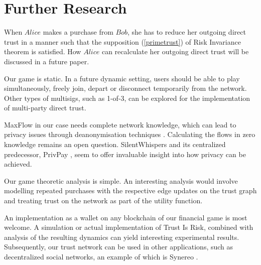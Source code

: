 \section{Further Research}

    When $Alice$ makes a purchase from $Bob$, she has to reduce her outgoing direct trust in a manner such that the
    supposition (\ref{primetrust}) of Risk Invariance theorem is satisfied. How $Alice$ can recalculate her outgoing
    direct trust will be discussed in a future paper.

    Our game is static. In a future dynamic setting, users should be able to play simultaneously, freely join, depart or
    disconnect temporarily from the network. Other types of multisigs, such as 1-of-3, can be explored for the
    implementation of multi-party direct trust.

    MaxFlow in our case needs complete network knowledge, which can lead to privacy issues through deanonymisation
    techniques \cite{deanonymisation}. Calculating the flows in zero knowledge remains an open question.
    SilentWhispers \cite{silentwhispers} and its centralized predecessor, PrivPay \cite{privpay}, seem to offer invaluable
    insight into how privacy can be achieved.

    Our game theoretic analysis is simple. An interesting analysis would involve modelling repeated purchases with the
    respective edge updates on the trust graph and treating trust on the network as part of the utility function.

    An implementation as a wallet on any blockchain of our financial game is most welcome. A simulation or actual
    implementation of Trust Is Risk, combined with analysis of the resulting dynamics can yield interesting experimental
    results. Subsequently, our trust network can be used in other applications, such as decentralized social networks, an
    example of which is Synereo \cite{synereo}.

